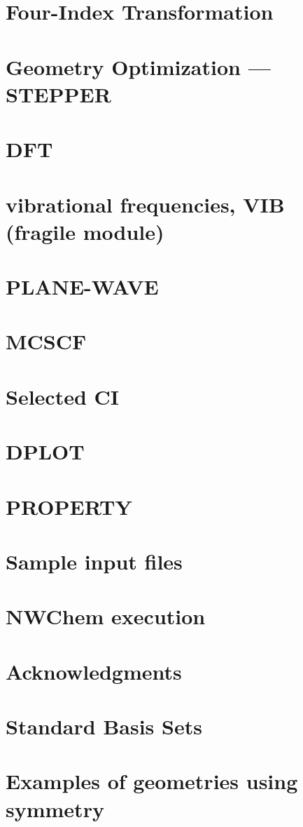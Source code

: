 \section{Four-Index Transformation} 


\section{Geometry Optimization --- STEPPER}


\section{DFT}


\section{vibrational frequencies, VIB (fragile module)}


\section{PLANE-WAVE}


\section{MCSCF}


\section{Selected CI}


\section{DPLOT}


\section{PROPERTY}


\section{Sample input files}


\section{NWChem execution}  


\section{Acknowledgments}


\appendix

\section{Standard Basis Sets}


\section{Examples of geometries using symmetry}



